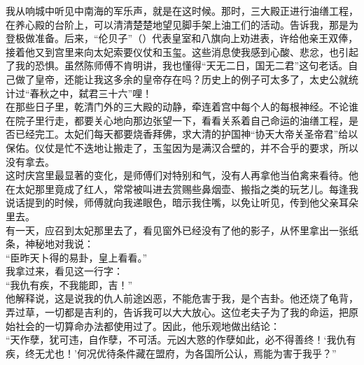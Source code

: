我从响城中听见中南海的军乐声，就是在这时候。那时，三大殿正进行油缮工程，在养心殿的台阶上，可以清清楚楚地望见脚手架上油工们的活动。告诉我，那是为登极做准备。后来，“伦贝子”（）代表皇室和八旗向上劝进表，许给他亲王双俸，接着他又到宫里来向太妃索要仪仗和玉玺。这些消息使我感到心酸、悲忿，也引起了我的恐惧。虽然陈师傅不肯明讲，我也懂得“天无二日，国无二君”这句老话。自己做了皇帝，还能让我这多余的皇帝存在吗？历史上的例子可太多了，太史公就统计过“春秋之中，弑君三十六”哩！\\

在那些日子里，乾清门外的三大殿的动静，牵连着宫中每个人的每根神经。不论谁在院子里行走，都要关心地向那边张望一下，看看关系着自己命运的油缮工程，是否已经完工。太妃们每天都要烧香拜佛，求大清的护国神“协天大帝关圣帝君”给以保佑。仪仗是忙不迭地让搬走了，玉玺因为是满汉合壁的，并不合乎的要求，所以没有拿去。\\

这时庆宫里最显著的变化，是师傅们对特别和气，没有人再拿他当伯禽来看待。他在太妃那里竟成了红人，常常被叫进去赏赐些鼻烟壶、搬指之类的玩艺儿。每逢我说话提到的时候，师傅就向我递眼色，暗示我住嘴，以免让听见，传到他父亲耳朵里去。\\

有一天，应召到太妃那里去了，看见窗外已经没有了他的影子，从怀里拿出一张纸条，神秘地对我说：\\

“臣昨天卜得的易卦，皇上看看。”\\

我拿过来，看见这一行字：\\

“我仇有疾，不我能即，吉！”\\

他解释说，这是说我的仇人前途凶恶，不能危害于我，是个吉卦。他还烧了龟背，弄过草，一切都是吉利的，告诉我可以大大放心。这位老夫子为了我的命运，把原始社会的一切算命办法都使用过了。因此，他乐观地做出结论：\\

“天作孽，犹可违，自作孽，不可活。元凶大憝的作孽如此，必不得善终！‘我仇有疾，终无尤也！’何况优待条件藏在盟府，为各国所公认，焉能为害于我乎？”\\

